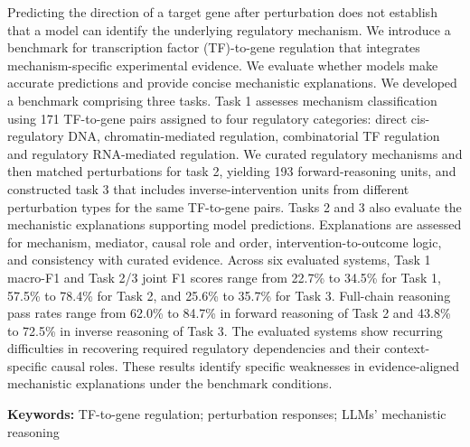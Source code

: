 Predicting the direction of a target gene after perturbation does not establish that a model can identify the underlying regulatory mechanism. We introduce a benchmark for transcription factor (TF)-to-gene regulation that integrates mechanism-specific experimental evidence. We evaluate whether models make accurate predictions and provide concise mechanistic explanations. We developed a benchmark comprising three tasks. Task 1 assesses mechanism classification using 171 TF-to-gene pairs assigned to four regulatory categories: direct cis-regulatory DNA, chromatin-mediated regulation, combinatorial TF regulation and regulatory RNA-mediated regulation. We curated regulatory mechanisms and then matched perturbations for task 2, yielding 193 forward-reasoning units, and constructed task 3 that includes inverse-intervention units from different perturbation types for the same TF-to-gene pairs. Tasks 2 and 3 also evaluate the mechanistic explanations supporting model predictions. Explanations are assessed for mechanism, mediator, causal role and order, intervention-to-outcome logic, and consistency with curated evidence. Across six evaluated systems, Task 1 macro-F1 and Task 2/3 joint F1 scores range from 22.7\% to 34.5\% for Task 1, 57.5\% to 78.4\% for Task 2, and 25.6\% to 35.7\% for Task 3. Full-chain reasoning pass rates range from 62.0\% to 84.7\% in forward reasoning of Task 2 and 43.8\% to 72.5\% in inverse reasoning of Task 3. The evaluated systems show recurring difficulties in recovering required regulatory dependencies and their context-specific causal roles. These results identify specific weaknesses in evidence-aligned mechanistic explanations under the benchmark conditions. 

\par\medskip
\noindent\textbf{Keywords:} TF-to-gene regulation; perturbation responses; LLMs' mechanistic reasoning
